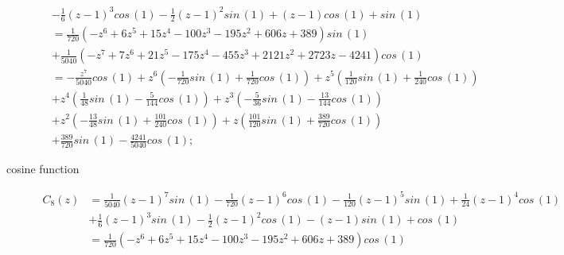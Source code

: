 \begin{description}
\begin{displaymath}
\begin{split}
                             &- \frac{1}{6} \left(z - 1\right)^{3} cos\,{\left (1 \right )} - \frac{1}{2} \left(z - 1\right)^{2} sin\,{\left (1 \right )} + \left(z - 1\right) cos\,{\left (1 \right )} + sin\,{\left (1 \right )}\\
                             &= \frac{1}{720} \left(- z^{6} + 6 z^{5} + 15 z^{4} - 100 z^{3} - 195 z^{2} + 606 z + 389\right) sin\,{\left (1 \right )} \\
                             &+ \frac{1}{5040} \left(- z^{7} + 7 z^{6} + 21 z^{5} - 175 z^{4} - 455 z^{3} + 2121 z^{2} + 2723 z - 4241\right) cos\,{\left (1 \right )} \\
                             &= - \frac{z^{7}}{5040} cos\,{\left (1 \right )} + z^{6} \left(- \frac{1}{720} sin\,{\left (1 \right )} + \frac{1}{720} cos\,{\left (1 \right )}\right) + z^{5} \left(\frac{1}{120} sin\,{\left (1 \right )} + \frac{1}{240} cos\,{\left (1 \right )}\right) \\
                             &+ z^{4} \left(\frac{1}{48} sin\,{\left (1 \right )} - \frac{5}{144} cos\,{\left (1 \right )}\right) + z^{3} \left(- \frac{5}{36} sin\,{\left (1 \right )} - \frac{13}{144} cos\,{\left (1 \right )}\right)\\
                             &+ z^{2} \left(- \frac{13}{48} sin\,{\left (1 \right )} + \frac{101}{240} cos\,{\left (1 \right )}\right) + z \left(\frac{101}{120} sin\,{\left (1 \right )} + \frac{389}{720} cos\,{\left (1 \right )}\right) \\
                             &+ \frac{389}{720} sin\,{\left (1 \right )} - \frac{4241}{5040} cos\,{\left (1 \right )};
    \end{split}
\end{displaymath}
\item[cosine function]
\begin{displaymath}
    \begin{split}
        C_{8}{\left (z \right )} &= \frac{1}{5040} \left(z - 1\right)^{7} sin\,{\left (1 \right )} - \frac{1}{720} \left(z - 1\right)^{6} cos\,{\left (1 \right )} - \frac{1}{120} \left(z - 1\right)^{5} sin\,{\left (1 \right )} + \frac{1}{24} \left(z - 1\right)^{4} cos\,{\left (1 \right )} \\ &+ \frac{1}{6} \left(z - 1\right)^{3} sin\,{\left (1 \right )} - \frac{1}{2} \left(z - 1\right)^{2} cos\,{\left (1 \right )} - \left(z - 1\right) sin\,{\left (1 \right )} + cos\,{\left (1 \right )} \\
                             &= \frac{1}{720} \left(- z^{6} + 6 z^{5} + 15 z^{4} - 100 z^{3} - 195 z^{2} + 606 z + 389\right) cos\,{\left (1 \right )} \\

\end{split}
\end{displaymath}
\end{description}
